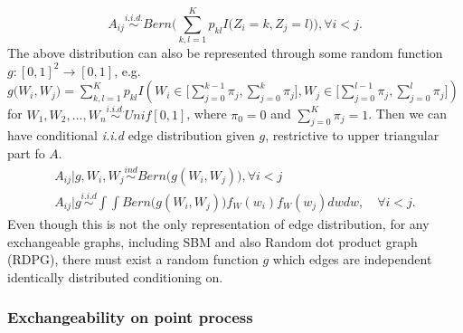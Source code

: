 \documentclass[12pt]{article}
\theoremstyle{definition}
\begin{document}
	\begin{equation} 
	A_{ij} \overset{i.i.d.}{\sim} Bern\big( \sum\limits_{k,l=1}^{K} p_{kl} I\big( Z_{i} = k, Z_{j} = l  \big)    \big), \forall  i < j.
	\end{equation}
The above distribution can also be represented through some random function $g : [0,1]^2 \rightarrow [0,1]$, e.g.$g\big( W_{i}, W_{j} \big) = \sum\limits_{k,l=1}^{K} p_{kl} I \left( W_{i} \in \big[ \sum\limits_{j=0}^{k-1} \pi_{j}, \sum\limits_{j=0}^{k} \pi_{j}   \big] , W_{j} \in \big[ \sum\limits_{j=0}^{l-1} \pi_{j}, \sum\limits_{j=0}^{l} \pi_{j}  \big]  \right)$ for  $W_{1}, W_{2}, ... , W_{n} \overset{i.i.d.}{\sim} Unif[0,1]$, where $\pi_{0} = 0$ and $\sum\limits_{j=0}^{K}  \pi_{j} = 1$. Then we can have conditional \textit{i.i.d} edge distribution given $g$, restrictive to upper triangular part fo $A$.
\begin{equation} 
\begin{gathered}
A_{ij} \big| g, W_{i}, W_{j} \overset{ind}{\sim} Bern \big( g(W_{i}, W_{j})  \big), \forall i < j \\ 
A_{ij} \big| g \overset{i.i.d}{\sim} \int \int Bern \big( g(W_{i}, W_{j}) \big) f_{W}(w_{i}) f_{W}(w_{j}) dw dw, \quad \forall i < j.  
\end{gathered}
\end{equation}
Even though this is not the only representation of edge distribution, for any exchangeable graphs, including SBM and also Random dot product graph (RDPG), there must exist a random function $g$ which edges are independent identically distributed conditioning on. 
	
\subsubsection{Exchangeability on point process}
	
\end{document}
